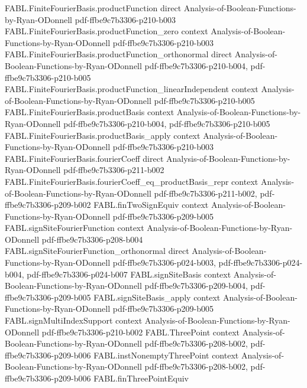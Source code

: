 \begin{theorem}
  {FABL.FiniteFourierBasis.productFunction}
  {direct}
  {Analysis-of-Boolean-Functions-by-Ryan-ODonnell}
  {pdf-ffbe9c7b3306-p210-b003}
\proofstep
  {FABL.FiniteFourierBasis.productFunction_zero}
  {context}
  {Analysis-of-Boolean-Functions-by-Ryan-ODonnell}
  {pdf-ffbe9c7b3306-p210-b003}
\proofstep
  {FABL.FiniteFourierBasis.productFunction_orthonormal}
  {direct}
  {Analysis-of-Boolean-Functions-by-Ryan-ODonnell}
  {pdf-ffbe9c7b3306-p210-b004,
    pdf-ffbe9c7b3306-p210-b005}
\proofstep
  {FABL.FiniteFourierBasis.productFunction_linearIndependent}
  {context}
  {Analysis-of-Boolean-Functions-by-Ryan-ODonnell}
  {pdf-ffbe9c7b3306-p210-b005}
\proofstep
  {FABL.FiniteFourierBasis.productBasis}
  {context}
  {Analysis-of-Boolean-Functions-by-Ryan-ODonnell}
  {pdf-ffbe9c7b3306-p210-b004,
    pdf-ffbe9c7b3306-p210-b005}
\proofstep
  {FABL.FiniteFourierBasis.productBasis_apply}
  {context}
  {Analysis-of-Boolean-Functions-by-Ryan-ODonnell}
  {pdf-ffbe9c7b3306-p210-b003}
\proofstep
  {FABL.FiniteFourierBasis.fourierCoeff}
  {direct}
  {Analysis-of-Boolean-Functions-by-Ryan-ODonnell}
  {pdf-ffbe9c7b3306-p211-b002}
\proofstep
  {FABL.FiniteFourierBasis.fourierCoeff_eq_productBasis_repr}
  {context}
  {Analysis-of-Boolean-Functions-by-Ryan-ODonnell}
  {pdf-ffbe9c7b3306-p211-b002,
    pdf-ffbe9c7b3306-p209-b002}
\proofstep
  {FABL.finTwoSignEquiv}
  {context}
  {Analysis-of-Boolean-Functions-by-Ryan-ODonnell}
  {pdf-ffbe9c7b3306-p209-b005}
\proofstep
  {FABL.signSiteFourierFunction}
  {context}
  {Analysis-of-Boolean-Functions-by-Ryan-ODonnell}
  {pdf-ffbe9c7b3306-p208-b004}
\proofstep
  {FABL.signSiteFourierFunction_orthonormal}
  {direct}
  {Analysis-of-Boolean-Functions-by-Ryan-ODonnell}
  {pdf-ffbe9c7b3306-p024-b003,
    pdf-ffbe9c7b3306-p024-b004,
    pdf-ffbe9c7b3306-p024-b007}
\proofstep
  {FABL.signSiteBasis}
  {context}
  {Analysis-of-Boolean-Functions-by-Ryan-ODonnell}
  {pdf-ffbe9c7b3306-p209-b004,
    pdf-ffbe9c7b3306-p209-b005}
\proofstep
  {FABL.signSiteBasis_apply}
  {context}
  {Analysis-of-Boolean-Functions-by-Ryan-ODonnell}
  {pdf-ffbe9c7b3306-p209-b005}
\proofstep
  {FABL.signMultiIndexSupport}
  {context}
  {Analysis-of-Boolean-Functions-by-Ryan-ODonnell}
  {pdf-ffbe9c7b3306-p210-b002}
\proofstep
  {FABL.ThreePoint}
  {context}
  {Analysis-of-Boolean-Functions-by-Ryan-ODonnell}
  {pdf-ffbe9c7b3306-p208-b002,
    pdf-ffbe9c7b3306-p209-b006}
\proofstep
  {FABL.instNonemptyThreePoint}
  {context}
  {Analysis-of-Boolean-Functions-by-Ryan-ODonnell}
  {pdf-ffbe9c7b3306-p208-b002,
    pdf-ffbe9c7b3306-p209-b006}
\proofstep
  {FABL.finThreePointEquiv}

\end{theorem}
